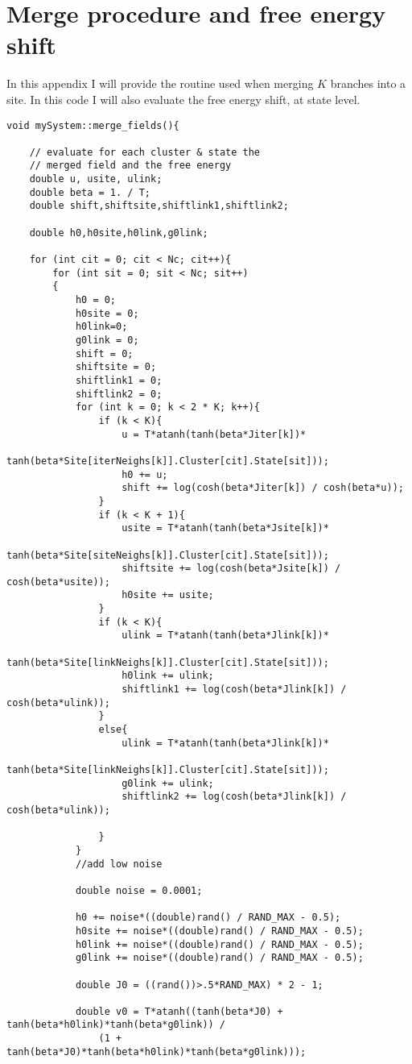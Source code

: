 \section{Merge procedure and free energy shift}

In this appendix I will provide the routine used when merging $K$ branches into a site. In this code I will also evaluate the free energy shift, at state level.

\begin{verbatim}
void mySystem::merge_fields(){

	// evaluate for each cluster & state the
	// merged field and the free energy
	double u, usite, ulink;
	double beta = 1. / T;
	double shift,shiftsite,shiftlink1,shiftlink2;

	double h0,h0site,h0link,g0link;

	for (int cit = 0; cit < Nc; cit++){
		for (int sit = 0; sit < Nc; sit++)
		{
			h0 = 0;
			h0site = 0;
			h0link=0;
			g0link = 0;
			shift = 0;
			shiftsite = 0;
			shiftlink1 = 0;
			shiftlink2 = 0;
			for (int k = 0; k < 2 * K; k++){
				if (k < K){
					u = T*atanh(tanh(beta*Jiter[k])*
						tanh(beta*Site[iterNeighs[k]].Cluster[cit].State[sit]));
					h0 += u;
					shift += log(cosh(beta*Jiter[k]) / cosh(beta*u));
				}
				if (k < K + 1){
					usite = T*atanh(tanh(beta*Jsite[k])*
						tanh(beta*Site[siteNeighs[k]].Cluster[cit].State[sit]));
					shiftsite += log(cosh(beta*Jsite[k]) / cosh(beta*usite));
					h0site += usite;
				}
				if (k < K){
					ulink = T*atanh(tanh(beta*Jlink[k])*
						tanh(beta*Site[linkNeighs[k]].Cluster[cit].State[sit]));
					h0link += ulink;
					shiftlink1 += log(cosh(beta*Jlink[k]) / cosh(beta*ulink));
				}
				else{
					ulink = T*atanh(tanh(beta*Jlink[k])*
						tanh(beta*Site[linkNeighs[k]].Cluster[cit].State[sit]));
					g0link += ulink;
					shiftlink2 += log(cosh(beta*Jlink[k]) / cosh(beta*ulink));
					
				}
			}
			//add low noise
			
			double noise = 0.0001;

			h0 += noise*((double)rand() / RAND_MAX - 0.5);
			h0site += noise*((double)rand() / RAND_MAX - 0.5);
			h0link += noise*((double)rand() / RAND_MAX - 0.5);
			g0link += noise*((double)rand() / RAND_MAX - 0.5);

			double J0 = ((rand())>.5*RAND_MAX) * 2 - 1;

			double v0 = T*atanh((tanh(beta*J0) + tanh(beta*h0link)*tanh(beta*g0link)) /
				(1 + tanh(beta*J0)*tanh(beta*h0link)*tanh(beta*g0link)));


\end{verbatim}
